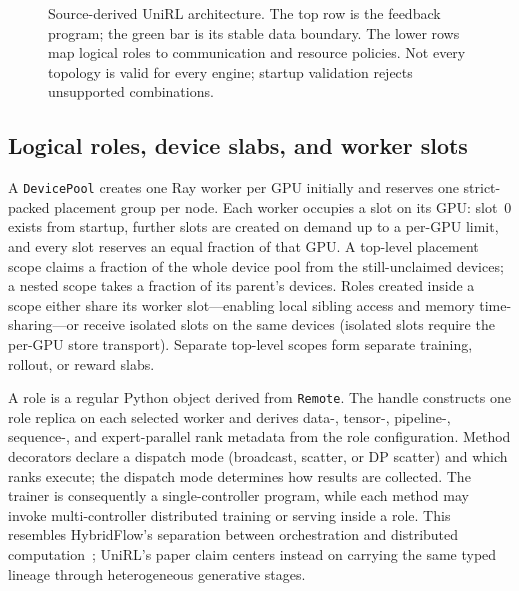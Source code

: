 \documentclass[10pt]{article}
\begin{document}
\begin{figure}[H]
{}
\caption{Source-derived UniRL architecture. The top row is the feedback program; the green bar is its stable data boundary. The lower rows map logical roles to communication and resource policies. Not every topology is valid for every engine; startup validation rejects unsupported combinations.}
\label{fig:architecture}
\end{figure}

\subsection{Logical roles, device slabs, and worker slots}

A \texttt{DevicePool} creates one Ray worker per GPU initially and reserves one strict-packed placement group per node.
Each worker occupies a slot on its GPU: slot~0 exists from startup, further slots are created on demand up to a per-GPU limit, and every slot reserves an equal fraction of that GPU.
A top-level placement scope claims a fraction of the whole device pool from the still-unclaimed devices; a nested scope takes a fraction of its parent's devices.
Roles created inside a scope either share its worker slot---enabling local sibling access and memory time-sharing---or receive isolated slots on the same devices (isolated slots require the per-GPU store transport).
Separate top-level scopes form separate training, rollout, or reward slabs.

A role is a regular Python object derived from \texttt{Remote}.
The handle constructs one role replica on each selected worker and derives data-, tensor-, pipeline-, sequence-, and expert-parallel rank metadata from the role configuration.
Method decorators declare a dispatch mode (broadcast, scatter, or DP scatter) and which ranks execute; the dispatch mode determines how results are collected.
The trainer is consequently a single-controller program, while each method may invoke multi-controller distributed training or serving inside a role.
This resembles HybridFlow's separation between orchestration and distributed computation~\citep{sheng2024hybridflow}; UniRL's paper claim centers instead on carrying the same typed lineage through heterogeneous generative stages.
\end{document}
